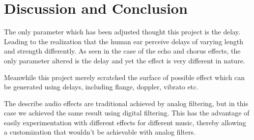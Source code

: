 \clearpage
\section{Discussion and Conclusion}
The only parameter which has been adjusted thought this project is the delay. Leading to the realization that the human ear perceive delays of varying length and strength differently. As seen in the case of the echo and chorus effects, the only parameter altered is the delay and yet the effect is very different in nature.

Meanwhile this project merely scratched the surface of possible effect which can be generated using delays, including flange, doppler, vibrato etc.     

The describe audio effects are traditional achieved by analog filtering, but in this case we achieved the same result using digital filtering. This has the advantage of easily experimentation with different effects for different music, thereby allowing a customization that wouldn't be achievable with analog filters.

